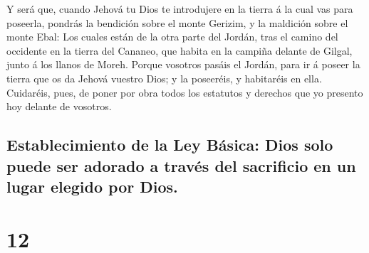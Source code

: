  Y será que, cuando Jehová tu Dios te introdujere en la
tierra á la cual vas para poseerla, pondrás la bendición sobre el monte
Gerizim, y la maldición sobre el monte Ebal:  Los cuales
están de la otra parte del Jordán, tras el camino del occidente en la
tierra del Cananeo, que habita en la campiña delante de Gilgal, junto á
los llanos de Moreh.  Porque vosotros pasáis el Jordán,
para ir á poseer la tierra que os da Jehová vuestro Dios; y la
poseeréis, y habitaréis en ella.  Cuidaréis, pues, de poner
por obra todos los estatutos y derechos que yo presento hoy delante de
vosotros.

\hypertarget{establecimiento-de-la-ley-buxe1sica-dios-solo-puede-ser-adorado-a-travuxe9s-del-sacrificio-en-un-lugar-elegido-por-dios.}{%
\subsection{Establecimiento de la Ley Básica: Dios solo puede ser
adorado a través del sacrificio en un lugar elegido por
Dios.}\label{establecimiento-de-la-ley-buxe1sica-dios-solo-puede-ser-adorado-a-travuxe9s-del-sacrificio-en-un-lugar-elegido-por-dios.}}

\hypertarget{section-11}{%
\section{12}\label{section-11}}

